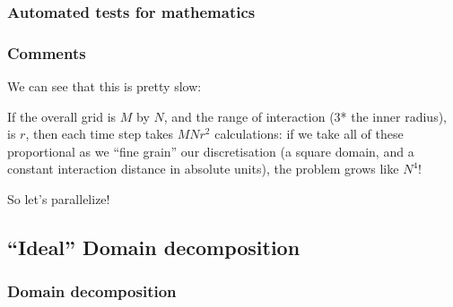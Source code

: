 \subsubsection{Automated tests for
mathematics}\label{automated-tests-for-mathematics}

\begin{Shaded}
\begin{Highlighting}[]

  \NormalTok{) \{}
     \NormalTok{);}
    \NormalTok{, }\NormalTok{, }\NormalTok{) == }\NormalTok{);}
    \NormalTok{, }\NormalTok{, } \NormalTok{);}
    \NormalTok{, }\NormalTok{, }\NormalTok{) == }\NormalTok{);}
    \NormalTok{, }\NormalTok{, }\NormalTok{)) < }\NormalTok{);}
  \NormalTok{\}}
\end{Highlighting}
\end{Shaded}

\subsubsection{Comments}\label{comments-1}

We can see that this is pretty slow:

If the overall grid is $M$ by $N$, and the range of interaction (3* the
inner radius), is $r$, then each time step takes $MNr^2$ calculations:
if we take all of these proportional as we ``fine grain'' our
discretisation (a square domain, and a constant interaction distance in
absolute units), the problem grows like $N^4$!

So let's parallelize!

\subsection{``Ideal'' Domain
decomposition}\label{ideal-domain-decomposition}

\subsubsection{Domain decomposition}\label{domain-decomposition}

